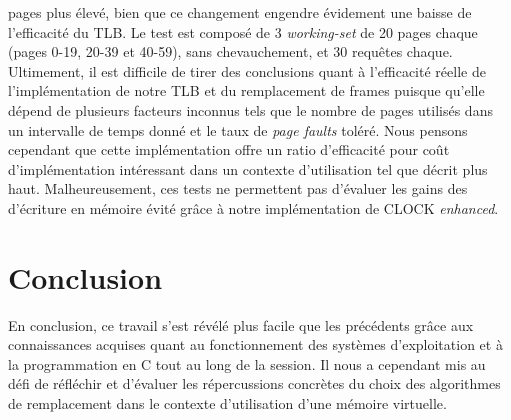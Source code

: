 \documentclass{article}
\begin{document}
pages plus élevé, bien que ce changement engendre évidement une baisse de l’efficacité du TLB. Le test est composé de 3 \emph{working-set} de 20 pages
 chaque (pages 0-19, 20-39 et 40-59), sans chevauchement, et 30 requêtes chaque. 
\\
Ultimement, il est difficile de tirer des conclusions quant à l’efficacité réelle de l’implémentation de notre TLB et du remplacement de frames 
puisque qu’elle dépend de plusieurs facteurs inconnus tels que le nombre de pages utilisés dans un intervalle de temps donné et le taux de  \emph{page faults}
 toléré. Nous pensons cependant que cette implémentation offre un ratio d’efficacité pour coût d’implémentation intéressant dans un contexte 
d’utilisation tel que décrit plus haut. Malheureusement, ces tests ne permettent pas d’évaluer les gains des d’écriture en mémoire évité grâce à
 notre implémentation de CLOCK \emph{enhanced}.
 \\
\section{Conclusion}
En conclusion, ce travail s’est révélé plus facile que les précédents grâce aux connaissances acquises quant au fonctionnement des systèmes
 d’exploitation et à la programmation en C tout au long de la session. Il nous a cependant mis au défi de réfléchir et d’évaluer les répercussions 
 concrètes du choix des algorithmes de remplacement dans le contexte d’utilisation d’une mémoire virtuelle.
 

\setlength{\parindent}{20pt}
\end{document}
